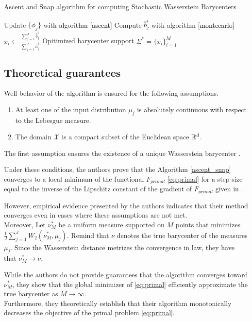 \begin{algorithm}
    \caption{Ascent and Snap algorithm for computing Stochastic Wasserstein Barycenters}
    \label{ascent_snap}
    \begin{algorithmic}[1]
            \STATE Update $\lbrace \phi_j \rbrace$ with algorithm \ref{ascent} 
            \STATE Compute $\hat{b}_j^i$ with algorithm \ref{montecarlo} 
                \STATE $x_i \gets \frac{\sum_{j=1}^J \hat{b}_j^i }{\sum_{j=1}^{J}\hat{a}_j^i}$ 
            \ENDFOR
        \ENDFOR
        \RETURN Opitimized barycenter support $\Sigma^* = \lbrace x_i \rbrace_{i=1}^M$
    \end{algorithmic}
\end{algorithm}


\subsection{Theoretical guarantees}

Well behavior of the algorithm is ensured for the following assumptions.
\begin{enumerate}
    \item \label{H1} At least one of the input distribution $\mu_j$ is absolutely continuous with respect to the Lebesgue measure.
    \item The domain $\mathcal{X}$ is a compact subset of the Euclidean space $\mathbb{R}^d$.
\end{enumerate}
The first assumption ensures the existence of a unique Wasserstein barycenter \cite{claici_stochastic_2018}. 

Under these conditions, the authors prove that the Algorithm \ref{ascent_snap} converges to a local minimum of the functional $F_{primal}$ \eqref{eq:primal} for a step size equal to the inverse of the Lipschitz constant of the gradient of $F_{primal}$ given in \cite{claici_stochastic_2018}. 

However, empirical evidence presented by the authors indicates that their method converges even in cases where these assumptions are not met. \\ 

Moreover, Let $\nu_M^*$ be a uniform measure supported on $M$ points that minimizes $\frac{1}{J}\sum_{j=1}^{J} W_2(\nu_M^*, \mu_j)$. Remind that $\nu$ denotes the true barycenter of the measures ${\mu_j}$. Since the Wasserstein distance metrizes the convergence in law, they have that $\nu_M^* \rightarrow \nu$.

While the authors do not provide guarantees that the algorithm converges toward $\nu_M^*$, they show that the global minimizer of \eqref{eq:primal} efficiently approximate the true barycenter as $M \rightarrow \infty$. \\ 

Furthermore, they theoretically establish that their algorithm monotonically decreases the objective of the primal problem \eqref{eq:primal}.


